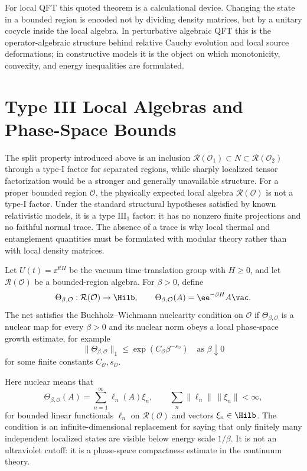 For local QFT this quoted theorem is a calculational device.  Changing the state in a
bounded region is encoded not by dividing density matrices, but by a unitary
cocycle inside the local algebra.  In perturbative algebraic QFT this is the
operator-algebraic structure behind relative Cauchy evolution and local
source deformations; in constructive models it is the object on which
monotonicity, convexity, and energy inequalities are formulated.

\section{Type III Local Algebras and Phase-Space Bounds}
\label{sec:type-iii-local-algebras-phase-space-bounds}

The split property introduced above is an inclusion
\(\mathcal R(\mathcal O_1)\subset N\subset\mathcal R(\mathcal O_2)\) through a
type-I factor for separated regions, while sharply localized tensor
factorization would be a stronger and generally unavailable structure.  For a
proper bounded region \(\mathcal O\), the physically expected local algebra
\(\mathcal R(\mathcal O)\) is not a type-I factor.  Under the standard
structural hypotheses satisfied by known relativistic models, it is a
type \(\mathrm{III}_1\) factor: it has no nonzero finite projections and no
faithful normal trace.  The absence of a trace is why local thermal and
entanglement quantities must be formulated with modular theory rather than
with local density matrices.

\begin{definition}
\label{def:buchholz-wichmann-nuclearity-map}
Let \(U(t)=\ee^{\ii tH}\) be the vacuum time-translation group with
\(H\ge0\), and let \(\mathcal R(\mathcal O)\) be a bounded-region algebra.
For \(\beta>0\), define
\[
  \Theta_{\beta,\mathcal O}:
  \mathcal R(\mathcal O)\to\Hilb,
  \qquad
  \Theta_{\beta,\mathcal O}(A)=\ee^{-\beta H}A\vac .
\]
The net satisfies the Buchholz--Wichmann nuclearity condition on
\(\mathcal O\) if \(\Theta_{\beta,\mathcal O}\) is a nuclear map for every
\(\beta>0\) and its nuclear norm obeys a local phase-space growth estimate,
for example
\[
  \|\Theta_{\beta,\mathcal O}\|_1
  \le
  \exp\!\left(C_{\mathcal O}\beta^{-s_{\mathcal O}}\right)
  \quad\text{as }\beta\downarrow0
\]
for some finite constants \(C_{\mathcal O},s_{\mathcal O}\).
\end{definition}

Here nuclear means that
\[
  \Theta_{\beta,\mathcal O}(A)=
  \sum_{n=1}^{\infty}\ell_n(A)\xi_n,
  \qquad
  \sum_n\|\ell_n\|\,\|\xi_n\|<\infty ,
\]
for bounded linear functionals \(\ell_n\) on \(\mathcal R(\mathcal O)\) and
vectors \(\xi_n\in\Hilb\).  The condition is an infinite-dimensional
replacement for saying that only finitely many independent localized states
are visible below energy scale \(1/\beta\).  It is not an ultraviolet cutoff:
it is a phase-space compactness estimate in the continuum theory.

